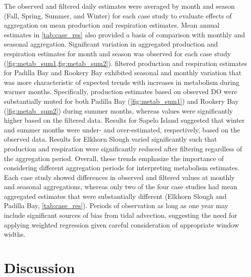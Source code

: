\documentclass[letterpaper,12pt,oneside]{article}\usepackage[]{graphicx}\usepackage[]{color}
\begin{document}
The observed and filtered daily estimates were averaged by month and season (Fall, Spring, Summer, and Winter) for each case study to evaluate effects of aggregation on mean production and respiration estimates.  Mean annual estimates in \cref{tab:case_res} also provided a basis of comparison with monthly and seasonal aggregation. Significant variation in aggregated production and respiration estimates for month and season was observed for each case study (\cref{fig:metab_sum1,fig:metab_sum2}).  filtered production and respiration estimates for Padilla Bay and Rookery Bay exhibited seasonal and monthly variation that was more characteristic of expected trends with increases in metabolism during warmer months.  Specifically, production estimates based on observed \ac{DO} were substantially muted for both Padilla Bay (\cref{fig:metab_sum1}) and Rookery Bay (\cref{fig:metab_sum2}) during summer months, whereas values were significantly higher based on the filtered data. Results for Sapelo Island suggested that winter and summer months were under- and over-estimated, respectively, based on the observed data.  Results for Elkhorn Slough varied significantly such that production and respiration were significantly reduced after filtering regardless of the aggregation period.  Overall, these trends emphasize the importance of considering different aggregation periods for interpreting metabolism estimates.  Each case study showed differences in observed and filtered values at monthly and seasonal aggregations, whereas only two of the four case studies had mean aggregated estimates that were substantially different (Elkhorn Slough and Padilla Bay, \cref{tab:case_res}).  Periods of observation as long as one year may include significant sources of bias from tidal advection, suggesting the need for applying weighted regression given careful consideration of appropriate window widths.       

 

\section{Discussion}
\end{document}
